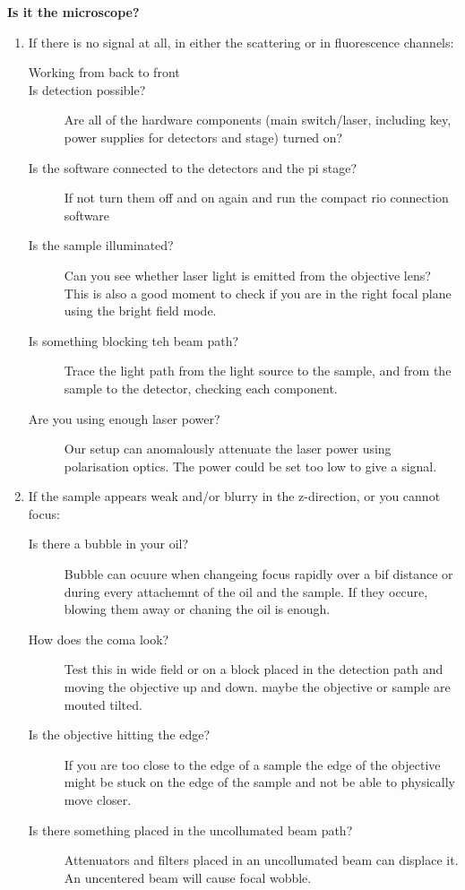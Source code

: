 \begin{description}
	\item \textbf{Is it the microscope?}
	\begin{enumerate}
		\item If there is no signal at all, in either the scattering or in fluorescence channels:
		\begin{description}
			\item[Working from back to front]
			\item[Is detection possible?] Are all of the hardware components (main switch/laser, including key, power supplies for detectors and stage) turned on?
			\item[Is the software connected to the detectors and the pi stage?] If not turn them off and on again and run the compact rio connection software
			\item[Is the sample illuminated?] Can you see whether laser light is emitted from the objective lens? This is also a good moment to check if you are in the right focal plane using the bright field mode.
			\item[Is something blocking teh beam path?] Trace the light path from the light source to the sample, and from the sample to the detector, checking each component.
			\item[Are you using enough laser power?] Our setup can anomalously attenuate the laser power using polarisation optics. The power could be set too low to give a signal.
		\end{description}
		\item If the sample appears weak and/or blurry in the z-direction, or you cannot focus:
		\begin{description}
			\item[Is there a bubble in your oil?] Bubble can ocuure when changeing focus rapidly over a bif distance or during every attachemnt of the oil and the sample. If they occure, blowing them away or chaning the oil is enough.
			\item[How does the coma look?] Test this in wide field or on a block placed in the detection path and moving the objective up and down. maybe the objective or sample are mouted tilted. 
			\item[Is the objective hitting the edge?] If you are too close to the edge of a sample the edge of the objective might be stuck on the edge of the sample and not be able to physically move closer.
			\item[Is there something placed in the uncollumated beam path? ] Attenuators and filters placed in an uncollumated beam can displace it. An uncentered beam will cause focal wobble.

\end{description}
\end{enumerate}
\end{description}
